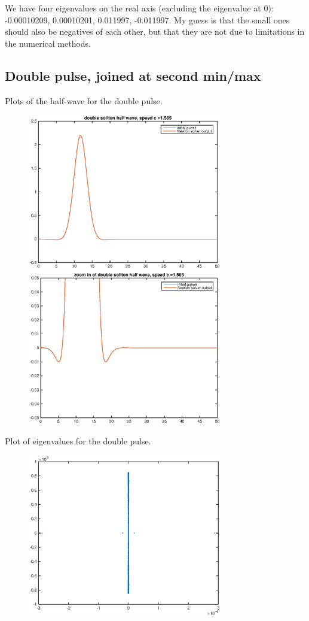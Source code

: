 \documentclass[12pt]{article}
\begin{document}
We have four eigenvalues on the real axis (excluding the eigenvalue at 0): -0.00010209, 0.00010201, 0.011997, -0.011997. My guess is that the small ones should also be negatives of each other, but that they are not due to limitations in the numerical methods.

\subsection*{Double pulse, joined at second min/max}
Plots of the half-wave for the double pulse.
	\begin{figure}[H]
	\includegraphics[width=8.5cm]{D2_fd50_half.eps}
	\includegraphics[width=8.5cm]{D2_fd50_half_zoom.eps}
	\end{figure}

Plot of eigenvalues for the double pulse.
	\begin{figure}[H]
	\includegraphics[width=8.5cm]{D2_fd50_val.eps}
	\end{figure}
\end{document}
